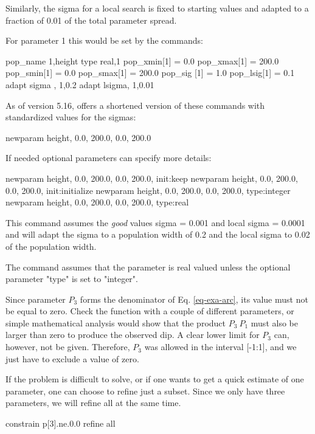 Similarly, the sigma for a local search is fixed to starting values 
and adapted to a fraction of 0.01 of the total parameter spread.

For parameter 1 this would be set by the commands:
\begin{MacVerbatim}
   pop_name    1,height
   type real,1
   pop_xmin[1] =   0.0
   pop_xmax[1] = 200.0
   pop_smin[1] =   0.0
   pop_smax[1] = 200.0
   pop_sig [1] =   1.0
   pop_lsig[1] =   0.1
   adapt sigma , 1,0.2
   adapt lsigma, 1,0.01
\end{MacVerbatim}

As of version 5.16, \Diffev offers a shortened version of these 
commands with standardized values for the sigmas:
\begin{MacVerbatim}
   newparam height, 0.0, 200.0, 0.0, 200.0
\end{MacVerbatim}

If needed optional parameters can specify more details:
\begin{MacVerbatim}
   newparam height, 0.0, 200.0, 0.0, 200.0, init:keep
   newparam height, 0.0, 200.0, 0.0, 200.0, init:initialize
   newparam height, 0.0, 200.0, 0.0, 200.0, type:integer
   newparam height, 0.0, 200.0, 0.0, 200.0, type:real
\end{MacVerbatim}

This command assumes the {\it good} values sigma = 0.001 and 
local sigma = 0.0001 and will adapt the sigma to a population 
width of 0.2 and the local sigma to 0.02 of the population width.

The command assumes that the parameter is real valued unless the
optional parameter "type" is set to "integer".

Since parameter $P_{3}$ forms the denominator of Eq. \ref{eq-exa-arc},
its value must not be equal to zero. Check the function with a couple 
of different parameters, or simple mathematical analysis 
would show that the product $P_{3}~P_{1}$ must also be larger 
than zero to produce the observed dip. A clear lower limit for 
$P_{3}$ can, however, not be given. Therefore, $P_{3}$ was allowed 
in the interval [-1:1], and we just have to exclude a value of zero.

If the problem is difficult to solve, or if one wants to get a quick
estimate of one parameter, one can choose to refine just a subset. 
Since we only have three parameters, we will refine all at the same
time.

\begin{MacVerbatim}
   constrain p[3].ne.0.0
   refine     all
\end{MacVerbatim}

